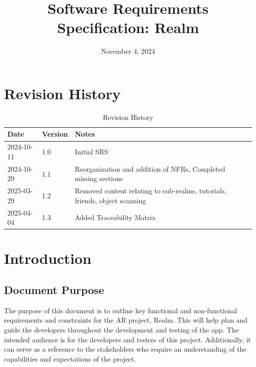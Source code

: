 \documentclass{article}
\title{Software Requirements Specification: Realm\\\progname}
\author{\authname}
\date{November 4, 2024}
\begin{document}
\maketitle

\newpage{}

\tableofcontents

\section*{Revision History}

\begin{table}[hp]
    \begin{tabularx}{\textwidth}{p{3cm}p{2cm}X}
        \toprule {\textbf{Date}} & {\textbf{Version}} & {\textbf{Notes}}                                                \\
        \midrule
        2024-10-11               & 1.0                & Initial SRS                                                     \\
        \midrule
        2024-10-29               & 1.1                & Reorganization and addition of NFRs, Completed missing sections \\
        \midrule
        2025-03-29               & 1.2                & Removed content relating to sub-realms, tutorials, friends, object scanning \\
        \midrule
        2025-04-04               & 1.3                & Added Traceability Matrix \\
        \bottomrule
    \end{tabularx}
    \caption{Revision History} \label{rev_history_table}
\end{table}

\section{Introduction}

\subsection{Document Purpose}

The purpose of this document is to outline key functional and non-functional requirements and constraints for the AR project, Realm. This will help plan and guide the developers throughout the development and testing of the app. The intended audience is for the developers and testers of this project. Additionally, it can serve as a reference to the stakeholders who require an understanding of the capabilities and expectations of the project.
\end{document}
